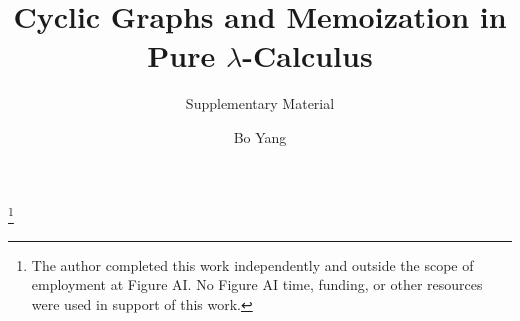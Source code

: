 \newcommand{\Sh}{\mathsf{Sh}}
\newcommand{\Lamsh}{\mathsf{Lam}}
\newcommand{\Appsh}{\mathsf{App}}
\newcommand{\Varsh}{\mathsf{Var}}
\newcommand{\dlam}{\mathord{\downarrow}\lambda}
\newcommand{\dhead}{\mathord{\downarrow}\mathsf{h}}
\newcommand{\darg}{\mathord{\downarrow}\mathsf{a}}
\newcommand{\subt}[2]{#1\!\downarrow\!#2}
\newcommand{\reduces}{\twoheadrightarrow}
\newcommand{\bred}{\rightarrow_{\beta}}
\newcommand{\present}{\mathtt{present}}


\makeatletter
{}
\makeatother



\title{Cyclic Graphs and Memoization in Pure $\lambda$-Calculus}
\ifColambdaBody\else
  \subtitle{Supplementary Material}
\fi

\author{Bo Yang}
\thanks{The author completed this work independently and outside the scope of employment at Figure AI. No Figure AI time, funding, or other resources were used in support of this work.}

